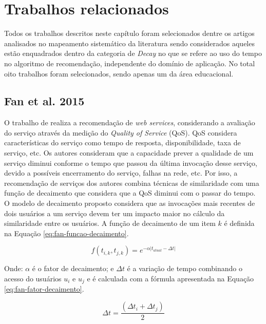 \chapter{Trabalhos relacionados}\label{chapter:trabalhos-relacionados}

Todos os trabalhos descritos neste capítulo foram selecionados dentre os artigos analisados no mapeamento sistemático
da literatura \cite{de2017time} sendo considerados aqueles  estão enquadrados dentro da categoria de \textit{Decay} no que
se refere ao uso do tempo no algoritmo de recomendação, independente do domínio de aplicação. No total oito trabalhos
foram selecionados, sendo apenas um da área educacional.

\section{Fan et al. 2015}

O trabalho de  realiza a recomendação de \textit{web services}, considerando a avaliação do serviço
através da medição do \textit{Quality of Service} (QoS). QoS considera características do serviço como tempo de resposta,
disponibilidade, taxa de serviço, etc. Os autores consideram que a capacidade prever a qualidade de um serviço diminui
conforme o tempo que passou da última invocação desse serviço, devido a possíveis encerramento do serviço, falhas na
rede, etc. Por isso, a recomendação de serviços dos autores combina técnicas de similaridade com uma função de
decaimento que considera que a QoS diminui com o passar do tempo. O modelo de decaimento proposto considera que as
invocações mais recentes de dois usuários a um serviço devem ter um impacto maior no cálculo da similaridade entre os
usuários. A função de decaimento de um item $k$ é definida na Equação \ref{eq:fan-funcao-decaimento}.

\begin{equation}
  \label{eq:fan-funcao-decaimento}
  f(t_{i,k}, t_{j,k}) = e^{-\alpha \left|t_{atual} - \Delta t \right|}
\end{equation}

Onde: $\alpha$ é o fator de decaimento; e $\Delta t$ é a variação de tempo combinando o acesso do usuários $u_i$ e $u_j$
e é calculada com a fórmula apresentada na Equação \ref{eq:fan-fator-decaimento}.

\begin{equation}
  \label{eq:fan-fator-decaimento}
  \Delta t = \frac{(\Delta t_i + \Delta t_j)}{2}
\end{equation}

